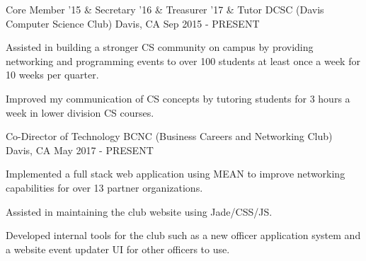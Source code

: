 

\begin{cventries}

  \cventry
    {Core Member '15 \& Secretary '16 \& Treasurer '17 \& Tutor} %
    {DCSC (Davis Computer Science Club)} %
    {Davis, CA} %
    {Sep 2015 - PRESENT} %
    {
      \begin{cvitems} %
        \item {Assisted in building a stronger CS community on campus by providing networking and programming events to over 100 students at least once a week for 10 weeks per quarter.}
        \item {Improved my communication of CS concepts by tutoring students for 3 hours a week in lower division CS courses.}
      \end{cvitems}
    }

  \cventry
    {Co-Director of Technology} %
    {BCNC (Business Careers and Networking Club)} %
    {Davis, CA} %
    {May 2017 - PRESENT} %
    {
      \begin{cvitems} %
        \item {Implemented a full stack web application using MEAN to improve networking capabilities for over 13 partner organizations.}
        \item {Assisted in maintaining the club website using Jade/CSS/JS.}
        \item {Developed internal tools for the club such as a new officer application system and a website event updater UI for other officers to use.}
      \end{cvitems}
    }

\end{cventries}
